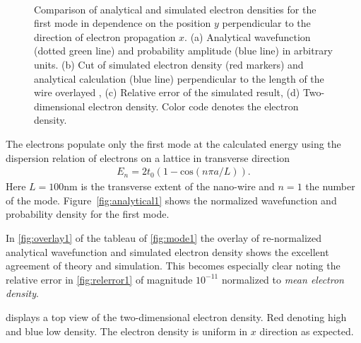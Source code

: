 \begin{figure}[h!]
  \begin{center}
 \qquad
    \\
    \qquad
    \caption{Comparison of analytical and simulated electron densities for the first mode in dependence on the position $y$ perpendicular to the direction of electron propagation $x$. (a) Analytical wavefunction (dotted green line) and probability amplitude (blue line) in arbitrary units. (b) Cut of simulated electron density (red markers) and analytical calculation (blue line) perpendicular to the length of the wire overlayed , (c) Relative error of the simulated result, (d) Two-dimensional electron density. Color code denotes the electron density. }
  \end{center}
\end{figure}
The electrons populate only the first mode at the calculated energy using the dispersion relation of electrons on a lattice in transverse direction
\begin{align}
E_{n} = 2t_0(1-\text{cos}(n\pi a/L)).
\label{eqn:dispersionlattice}
\end{align}
Here $L=100$nm is the transverse extent of the nano-wire and $n=1$ the number of the mode. Figure~\ref{fig:analytical1} shows the normalized wavefunction and probability density for the first mode.\par
In \cref{fig:overlay1} of the tableau of \cref{fig:mode1} the overlay of re-normalized analytical wavefunction and simulated electron density shows the excellent agreement of theory and simulation. This becomes especially clear noting the relative error in \cref{fig:relerror1} of magnitude $10^{-11}$ normalized to \emph{mean electron density}.\par
{} displays a top view of the two-dimensional electron density. Red denoting high and blue low density. The electron density is uniform in $x$ direction as expected.\par
